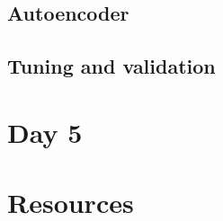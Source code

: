 \documentclass[a4paper,twoside]{tufte-book}\usepackage[]{graphicx}\usepackage[]{color}
\begin{document}
\section{Autoencoder}

\section{Tuning and validation}


\chapter{Day 5}





\chapter{Resources}




\end{document}
